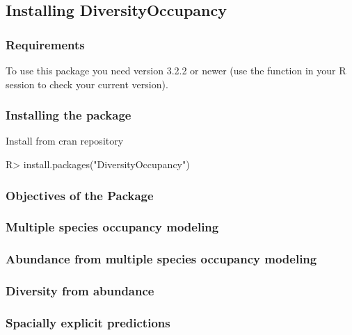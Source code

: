 \documentclass[article]{jss}
\begin{document}
\subsection{Installing
DiversityOccupancy}\label{installing-diversityoccupancy}

\subsubsection{Requirements}\label{requirements}

To use this package you need  version 3.2.2 or newer (use
the function  in your R session to check your
current version).

\subsubsection{Installing the package}\label{installing-the-package}

Install from cran repository

\begin{CodeChunk}

\begin{CodeInput}
R> install.packages("DiversityOccupancy")
\end{CodeInput}
\end{CodeChunk}

\subsubsection{Objectives of the
Package}\label{objectives-of-the-package}

\subsubsection{Multiple species occupancy
modeling}\label{multiple-species-occupancy-modeling}

\subsubsection{Abundance from multiple species occupancy
modeling}\label{abundance-from-multiple-species-occupancy-modeling}

\subsubsection{Diversity from abundance}\label{diversity-from-abundance}

\subsubsection{Spacially explicit
predictions}\label{spacially-explicit-predictions}
\end{document}
